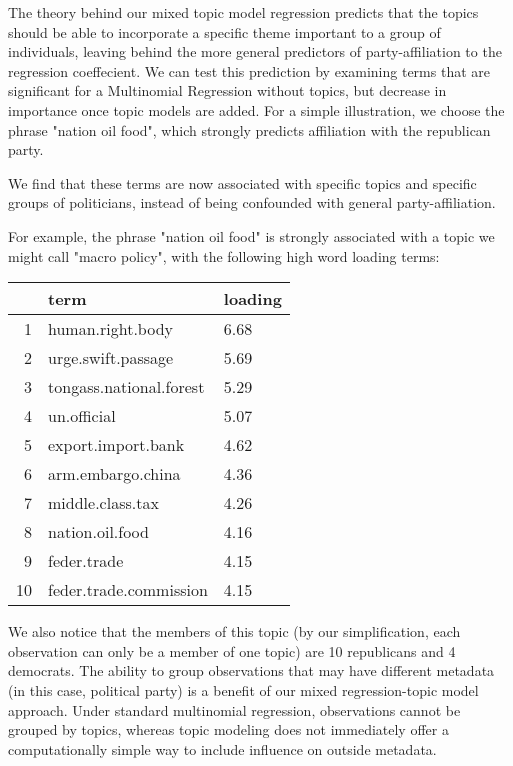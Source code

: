\documentclass[12pt]{article}
\begin{document}
The theory behind our mixed topic model regression predicts that the topics should be able to incorporate a specific theme important to a group of individuals, leaving behind the more general predictors of party-affiliation to the regression coeffecient.
We can test this prediction by examining terms that are significant for a Multinomial Regression without topics, but decrease in importance once topic models are added. For a simple illustration, we choose the phrase "nation oil food", which strongly predicts affiliation with the republican party. 

We find that these terms are now associated with specific topics and specific groups of politicians, instead of being confounded with general party-affiliation.

For example, the phrase "nation oil food" is strongly associated with a topic we might call "macro policy", with the following high word loading terms:

\begin{table}[ht]
\centering
\begin{tabular}{rll}
  \hline
 & term & loading \\ 
  \hline
1 & human.right.body & 6.68 \\ 
  2 & urge.swift.passage & 5.69 \\ 
  3 & tongass.national.forest & 5.29 \\ 
  4 & un.official & 5.07 \\ 
  5 & export.import.bank & 4.62 \\ 
  6 & arm.embargo.china & 4.36 \\ 
  7 & middle.class.tax & 4.26 \\ 
  8 & nation.oil.food & 4.16 \\ 
  9 & feder.trade & 4.15 \\ 
  10 & feder.trade.commission & 4.15 \\ 
   \hline
\end{tabular}
\end{table}

We also notice that the members of this topic (by our simplification, each observation can only be a member of one topic) are 10 republicans and 4 democrats. 
The ability to group observations that may have different metadata (in this case, political party) is a benefit of our mixed regression-topic model approach. 
Under standard multinomial regression, observations cannot be grouped by topics, whereas topic modeling does not immediately offer a computationally simple way to include influence on outside metadata.
\end{document}
